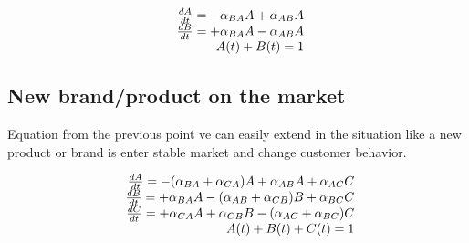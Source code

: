 \begin{equation} \label{eq:10}
\begin{array}{r@{}l}
\frac{dA}{dt} = -\alpha_{BA}A + \alpha_{AB}A \\
\frac{dB}{dt} = +\alpha_{BA}A - \alpha_{AB}A \\
A(t) + B(t) = 1
\end{array}
\end{equation}

\subsection{New brand/product on the market} \label{subsec:newbrand}
Equation from the previous point ve can easily extend in the situation like a new product or brand is enter
stable market and change customer behavior.

\begin{equation} \label{eq:11}
\begin{array}{r@{}l}
\frac{dA}{dt} = -(\alpha_{BA}+ \alpha_{CA})A + \alpha_{AB}A + \alpha_{AC}C \\
\frac{dB}{dt} = +\alpha_{BA}A - (\alpha_{AB} + \alpha_{CB})B + \alpha_{BC}C \\
\frac{dC}{dt} = +\alpha_{CA}A + \alpha_{CB}B - (\alpha_{AC} + \alpha_{BC})C \\
A(t) + B(t) + C(t) = 1
\end{array}
\end{equation}


